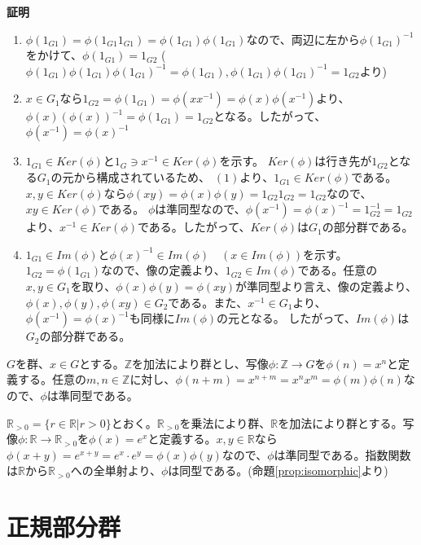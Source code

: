 \documentclass[dvipdfmx,autodetect-engine]{jsarticle}
\begin{document}
{\bf 証明}
\begin{enumerate}
\renewcommand{\labelenumi}{(\arabic{enumi})}
\item $\phi(1_{G1}) = \phi(1_{G1} 1_{G1}) = \phi(1_{G1})\phi(1_{G1})$なので、両辺に左から$\phi(1_{G1})^{-1}$をかけて、$\phi(1_{G1}) = 1_{G2}$ ($\phi(1_{G1})\phi(1_{G1})\phi(1_{G1})^{-1} = \phi(1_{G1}), \phi(1_{G1})\phi(1_{G1})^{-1} = 1_{G2}$より)

\item $x \in G_1$なら$1_{G2} = \phi(1_{G1}) = \phi(xx^{-1}) = \phi(x)\phi(x^{-1})$より、$\phi(x)(\phi(x))^{-1} = \phi(1_{G1}) = 1_{G2}$となる。したがって、$\phi(x^{-1}) = \phi(x)^{-1}$

\item $1_{G1} \in Ker(\phi)$と$1_G \ni x^{-1} \in Ker(\phi)$を示す。 $Ker(\phi)$は行き先が$1_{G2}$となる$G_1$の元から構成されているため、 $(1)より、1_{G1} \in Ker(\phi)$である。$x, y \in Ker(\phi)$なら$\phi(xy) = \phi(x)\phi(y) = 1_{G2}1_{G2} = 1_{G2}$なので、$xy \in Ker(\phi)$である。
$\phi$は準同型なので、$\phi(x^{-1}) = \phi(x)^{-1} = 1_{G2}^{-1} = 1_{G2}$より、$x^{-1} \in Ker(\phi)$である。したがって、$Ker(\phi)$は$G_1$の部分群である。

\item $1_{G1} \in Im(\phi)$と$\phi(x)^{-1} \in Im(\phi) \quad (x \in Im(\phi))$を示す。$1_{G2} = \phi(1_{G1})$なので、像の定義より、$1_{G2} \in Im(\phi)$である。任意の$x, y \in G_1$を取り、$\phi(x)\phi(y) = \phi(xy)$が準同型より言え、像の定義より、$\phi(x), \phi(y), \phi(xy) \in G_2$である。また、$x^{-1} \in G_1$より、$\phi(x^{-1}) = \phi(x)^{-1}$も同様に$Im(\phi)$の元となる。 したがって、$Im(\phi)$は$G_2$の部分群である。
\end{enumerate}

\exam $G$を群、$x \in G$とする。$\mathbb{Z}$を加法により群とし、写像$\phi: \mathbb{Z} \to G$を$\phi(n) = x^n$と定義する。任意の$m, n \in \mathbb{Z}$に対し、$\phi(n + m) = x^{n + m} = x^nx^m = \phi(m)\phi(n)$なので、$\phi$は準同型である。

\exam $\mathbb{R}_{>0} = \{r \in \mathbb{R} | r > 0\}$とおく。$\mathbb{R}_{>0}$を乗法により群、$\mathbb{R}$を加法により群とする。写像$\phi:\mathbb{R} \to \mathbb{R}_{>0}$を$\phi(x) = e^x$と定義する。$x, y \in \mathbb{R}$なら$\phi(x+y) = e^{x+y} = e^x \cdot e^y = \phi(x)\phi(y)$なので、$\phi$は準同型である。指数関数は$\mathbb{R}$から$\mathbb{R}_{>0}$への全単射より、$\phi$は同型である。(命題\ref{prop:isomorphic}より)

\section{正規部分群}
\end{document}
